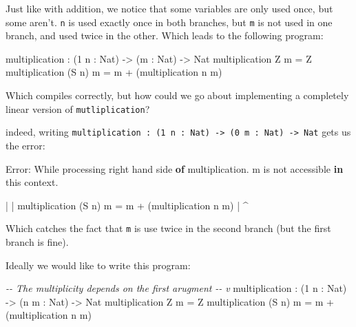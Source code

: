 \documentclass[
]{article}
\newenvironment{Shaded}{}{}
\newcommand{\CommentTok}[1]{\textcolor[rgb]{0.38,0.63,0.69}{\textit{#1}}}
\newcommand{\DataTypeTok}[1]{\textcolor[rgb]{0.56,0.13,0.00}{#1}}
\newcommand{\DecValTok}[1]{\textcolor[rgb]{0.25,0.63,0.44}{#1}}
\newcommand{\FunctionTok}[1]{\textcolor[rgb]{0.02,0.16,0.49}{#1}}
\newcommand{\KeywordTok}[1]{\textcolor[rgb]{0.00,0.44,0.13}{\textbf{#1}}}
\newcommand{\NormalTok}[1]{#1}
\newcommand{\OperatorTok}[1]{\textcolor[rgb]{0.40,0.40,0.40}{#1}}
\newcommand{\OtherTok}[1]{\textcolor[rgb]{0.00,0.44,0.13}{#1}}
\begin{document}
Just like with addition, we notice that some variables are only used
once, but some aren't. \texttt{n} is used exactly once in both branches,
but \texttt{m} is not used in one branch, and used twice in the other.
Which leads to the following program:

\begin{Shaded}
\begin{Highlighting}[]
\NormalTok{ multiplication }\OperatorTok{:}\NormalTok{ (}\DecValTok{1}\NormalTok{ n }\OperatorTok{:} \DataTypeTok{Nat}\NormalTok{) }\OtherTok{{-}\textgreater{}}\NormalTok{ (m }\OperatorTok{:} \DataTypeTok{Nat}\NormalTok{) }\OtherTok{{-}\textgreater{}} \DataTypeTok{Nat}
\NormalTok{ multiplication }\DataTypeTok{Z}\NormalTok{ m }\OtherTok{=} \DataTypeTok{Z}
\NormalTok{ multiplication (}\DataTypeTok{S}\NormalTok{ n) m }\OtherTok{=}\NormalTok{ m }\OperatorTok{+}\NormalTok{ (multiplication n m)}
\end{Highlighting}
\end{Shaded}

Which compiles correctly, but how could we go about implementing a
completely linear version of \texttt{mutliplication}?

indeed, writing
\texttt{multiplication\ :\ (1\ n\ :\ Nat)\ -\textgreater{}\ (0\ m\ :\ Nat)\ -\textgreater{}\ Nat}
gets us the error:

\begin{Shaded}
\begin{Highlighting}[]
\DataTypeTok{Error}\OperatorTok{:} \DataTypeTok{While}\NormalTok{ processing right hand side }\KeywordTok{of}\NormalTok{ multiplication}\OperatorTok{.}\NormalTok{ m is }\FunctionTok{not}\NormalTok{ accessible }\KeywordTok{in}\NormalTok{ this context}\OperatorTok{.}

    \OperatorTok{|}
    \OperatorTok{|}\NormalTok{ multiplication (}\DataTypeTok{S}\NormalTok{ n) m }\OtherTok{=}\NormalTok{ m }\OperatorTok{+}\NormalTok{ (multiplication n m)}
    \OperatorTok{|}                          \OperatorTok{\^{}}
\end{Highlighting}
\end{Shaded}

Which catches the fact that \texttt{m} is use twice in the second branch
(but the first branch is fine).

Ideally we would like to write this program:

\begin{Shaded}
\begin{Highlighting}[]
\CommentTok{{-}{-}        The multiplicity depends on the first arugment}
\CommentTok{{-}{-}                               v}
\NormalTok{multiplication }\OperatorTok{:}\NormalTok{ (}\DecValTok{1}\NormalTok{ n }\OperatorTok{:} \DataTypeTok{Nat}\NormalTok{) }\OtherTok{{-}\textgreater{}}\NormalTok{ (n m }\OperatorTok{:} \DataTypeTok{Nat}\NormalTok{) }\OtherTok{{-}\textgreater{}} \DataTypeTok{Nat}
\NormalTok{multiplication }\DataTypeTok{Z}\NormalTok{ m }\OtherTok{=} \DataTypeTok{Z}
\NormalTok{multiplication (}\DataTypeTok{S}\NormalTok{ n) m }\OtherTok{=}\NormalTok{ m }\OperatorTok{+}\NormalTok{ (multiplication n m)}
\end{Highlighting}
\end{Shaded}
\end{document}
